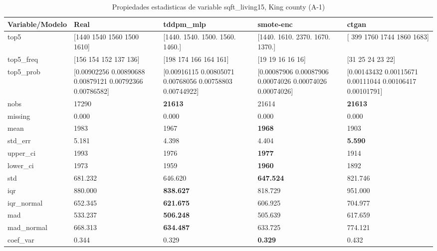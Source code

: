 \begin{table}[H]
\centering
\fontsize{8}{14}\selectfont
\caption{Propiedades  estadisticas de variable sqft\_living15, King county (A-1)}
\label{table-stats-king county-a-1-sqft_living15}
\begin{tabular}{|l|m{10em}|m{10em}|m{10em}|m{10em}|}
\hline
 \rowcolor[gray]{0.8}
Variable/Modelo & Real & tddpm\_mlp & smote-enc & ctgan \\
\hline top5 & [1440 1540 1560 1500 1610] & [1440. 1540. 1500. 1560. 1460.] & [1440. 1610. 2370. 1670. 1370.] & [ 399 1760 1744 1860 1683] \\
\hline top5\_freq & [156 154 152 137 136] & [198 174 166 164 161] & [19 19 16 16 16] & [31 25 24 23 22] \\
\hline top5\_prob & [0.00902256 0.00890688 0.00879121 0.00792366 0.00786582] & [0.00916115 0.00805071 0.00768056 0.00758803 0.00744922] & [0.00087906 0.00087906 0.00074026 0.00074026 0.00074026] & [0.00143432 0.00115671 0.00111044 0.00106417 0.00101791] \\
\hline nobs & 17290 & \bfseries 21613 & \cellcolor[rgb]{0.9, 0.54, 0.52} 21614 & \bfseries 21613 \\
\hline missing & 0.000 & 0.000 & 0.000 & 0.000 \\
\hline mean & 1983 & 1967 & \bfseries 1968 & \cellcolor[rgb]{0.9, 0.54, 0.52} 1903 \\
\hline std\_err & 5.181 & \cellcolor[rgb]{0.9, 0.54, 0.52} 4.398 & 4.404 & \bfseries 5.590 \\
\hline upper\_ci & 1993 & 1976 & \bfseries 1977 & \cellcolor[rgb]{0.9, 0.54, 0.52} 1914 \\
\hline lower\_ci & 1973 & 1959 & \bfseries 1960 & \cellcolor[rgb]{0.9, 0.54, 0.52} 1892 \\
\hline std & 681.232 & 646.620 & \bfseries 647.524 & \cellcolor[rgb]{0.9, 0.54, 0.52} 821.746 \\
\hline iqr & 880.000 & \bfseries 838.627 & 818.729 & \cellcolor[rgb]{0.9, 0.54, 0.52} 951.000 \\
\hline iqr\_normal & 652.345 & \bfseries 621.675 & 606.925 & \cellcolor[rgb]{0.9, 0.54, 0.52} 704.977 \\
\hline mad & 533.237 & \bfseries 506.248 & 505.639 & \cellcolor[rgb]{0.9, 0.54, 0.52} 617.659 \\
\hline mad\_normal & 668.313 & \bfseries 634.487 & 633.725 & \cellcolor[rgb]{0.9, 0.54, 0.52} 774.121 \\
\hline coef\_var & 0.344 & 0.329 & \bfseries 0.329 & \cellcolor[rgb]{0.9, 0.54, 0.52} 0.432 \\

\end{tabular}
\end{table}
